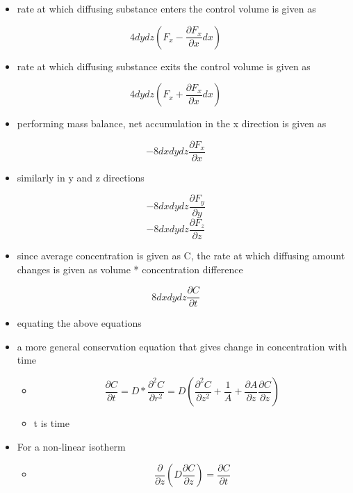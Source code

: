 \documentclass[11pt]{article}
\begin{document}
\begin{itemize}
\item rate at which diffusing substance enters the control volume is given as
\end{itemize}
\begin{equation}
4 dy dz (F_x - \frac{\partial F_x}{\partial x} dx)
\end{equation}
\begin{itemize}
\item rate at which diffusing substance exits the control volume is given as
\end{itemize}
\begin{equation}
4 dy dz (F_x + \frac{\partial F_x}{\partial x} dx)
\end{equation}
\begin{itemize}
\item performing mass balance, net accumulation in the x direction is given as
\end{itemize}
\begin{equation}
-8 dx dy dz \frac{\partial F_x}{\partial x}
\end{equation}
\begin{itemize}
\item similarly in y and z directions
\end{itemize}
\begin{equation}
-8 dx dy dz \frac{\partial F_y}{\partial y}
\end{equation}
\begin{equation}
-8 dx dy dz \frac{\partial F_z}{\partial z}
\end{equation}
\begin{itemize}
\item since average concentration is given as C, the rate at which diffusing amount changes is given as volume * concentration difference
\end{itemize}
\begin{equation}
8 dx dy dz \frac{\partial C}{\partial t}
\end{equation}
\begin{itemize}
\item equating the above equations

\item a more general conservation equation that gives change in concentration with time
\begin{itemize}
\item $$\frac{\partial C}{\partial t} = D * \frac{\partial^2 C}{\partial r^2} = D (\frac{\partial ^2 C}{\partial z ^2} + \frac{1}{A} + \frac{\partial A}{\partial z} \frac{\partial C}{\partial z})$$
\item t is time
\end{itemize}
\item For a non-linear isotherm \cite{Clarkson1999}
\begin{itemize}
\item $$\frac{\partial}{\partial z} (D {\frac{\partial C}{\partial z}}) = \frac{\partial C}{\partial t}$$
\end{itemize}
\end{itemize}
\end{document}
